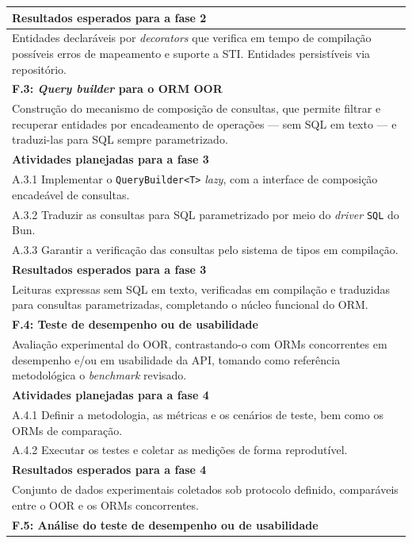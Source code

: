 \begin{longtable}{p{\textwidth}}
\midrule
\myrowcolour%
\bfseries Resultados esperados para a fase 2 \\
\midrule
Entidades declaráveis por \emph{decorators} que verifica em tempo de compilação possíveis erros de mapeamento e suporte a STI.
Entidades persistíveis via repositório. \\
\toprule%
\myrowcolour%
\bfseries F.3: \emph{Query builder} para o ORM OOR \\
\midrule
Construção do mecanismo de composição de consultas, que permite filtrar e recuperar entidades por encadeamento de operações --- sem SQL em texto --- e traduzi-las para SQL sempre parametrizado.
\\
\midrule
\myrowcolour%
\bfseries Atividades planejadas para a fase 3 \\
\midrule
A.3.1 Implementar o \texttt{QueryBuilder<T>} \emph{lazy}, com a interface de composição encadeável de consultas. \\
A.3.2 Traduzir as consultas para SQL parametrizado por meio do \emph{driver} \texttt{SQL} do Bun. \\
A.3.3 Garantir a verificação das consultas pelo sistema de tipos em compilação. \\
\midrule
\myrowcolour%
\bfseries Resultados esperados para a fase 3 \\
\midrule
Leituras expressas sem SQL em texto, verificadas em compilação e traduzidas para consultas parametrizadas, completando o núcleo funcional do ORM. \\
\toprule%
\myrowcolour%
\bfseries F.4: Teste de desempenho ou de usabilidade \\
\midrule
Avaliação experimental do OOR, contrastando-o com ORMs concorrentes em desempenho e/ou em usabilidade da API, tomando como referência metodológica o \emph{benchmark} revisado.
\\
\midrule
\myrowcolour%
\bfseries Atividades planejadas para a fase 4 \\
\midrule
A.4.1 Definir a metodologia, as métricas e os cenários de teste, bem como os ORMs de comparação. \\
A.4.2 Executar os testes e coletar as medições de forma reprodutível. \\
\midrule
\myrowcolour%
\bfseries Resultados esperados para a fase 4 \\
\midrule
Conjunto de dados experimentais coletados sob protocolo definido, comparáveis entre o OOR e os ORMs concorrentes. \\
\toprule%
\myrowcolour%
\bfseries F.5: Análise do teste de desempenho ou de usabilidade \\

\end{longtable}
